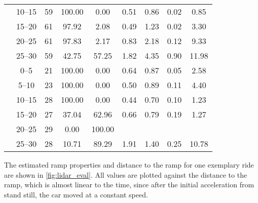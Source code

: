 \begin{table}[htb]
{\begin{tabular}{ccccccccc}
			                     & \SIrange{10}{15}{}              & 59                      & 100.00            & 0.00              & 0.51                              & 0.86 & 0.02 & 0.85  \\
			                     & \SIrange{15}{20}{}              & 61                      & 97.92             & 2.08              & 0.49                              & 1.23 & 0.02 & 3.30  \\
			                     & \SIrange{20}{25}{}              & 61                      & 97.83             & 2.17              & 0.83                              & 2.18 & 0.12 & 9.33  \\
			                     & \SIrange{25}{30}{}              & 59                      & 42.75             & 57.25             & 1.82                              & 4.35 & 0.90 & 11.98 \\
			\addlinespace
			\multirow{6}{*}{C}   & \SIrange{0}{5}{}                & 21                      & 100.00            & 0.00              & 0.64                              & 0.87 & 0.05 & 2.58  \\
			                     & \SIrange{5}{10}{}               & 23                      & 100.00            & 0.00              & 0.50                              & 0.89 & 0.11 & 4.40  \\
			                     & \SIrange{10}{15}{}              & 28                      & 100.00            & 0.00              & 0.44                              & 0.70 & 0.10 & 1.23  \\
			                     & \SIrange{15}{20}{}              & 27                      & 37.04             & 62.96             & 0.66                              & 0.79 & 0.19 & 1.27  \\
			                     & \SIrange{20}{25}{}              & 29                      & 0.00              & 100.00            &                                   &      &      &       \\
			                     & \SIrange{25}{30}{}              & 28                      & 10.71             & 89.29             & 1.91                              & 1.40 & 0.25 & 10.78 \\
			\bottomrule
		\end{tabular}
	}
\end{table}
\renewcommand{\arraystretch}{1.2}
The estimated ramp properties and distance to the ramp for one exemplary ride are shown in \cref{fig:lidar_eval}.
All values are plotted against the distance to the ramp, which is almost linear to the time, since after the initial acceleration from stand still, the car moved at a constant speed.
